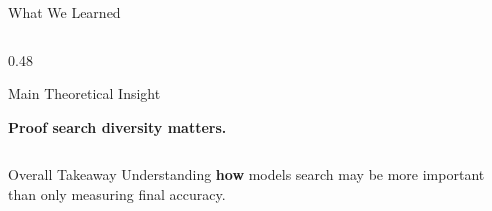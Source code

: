 \documentclass[aspectratio=169]{beamer}
\begin{document}
\begin{frame}{What We Learned}
\begin{columns}[T,onlytextwidth]
\begin{column}{0.48\textwidth}
\begin{block}{Main Theoretical Insight}
\begin{tikzpicture}
\end{tikzpicture}

\vspace{0.35cm}

{\large \textbf{Proof search diversity matters.}}

\end{block}

\end{column}

\end{columns}

\vspace{0.45cm}

\begin{alertblock}{Overall Takeaway}
\centering
\large Understanding \textbf{how} models search may be more important than only measuring final accuracy.
\end{alertblock}

\end{frame}
\end{document}
